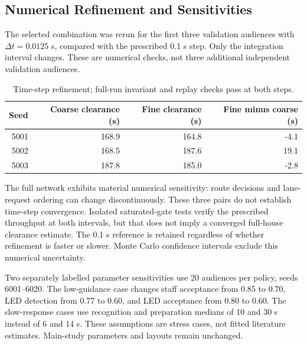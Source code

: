 \subsection{Numerical Refinement and Sensitivities}

The selected combination was rerun for the first three validation audiences with $\Delta t=0.0125$ s, compared with the prescribed 0.1 s step. Only the integration interval changes. These are numerical checks, not three additional independent validation audiences.

\begin{table}[htbp]\centering\small

\begin{tabular}{rrrr}\toprule

Seed & Coarse clearance (s) & Fine clearance (s) & Fine minus coarse (s)\\\midrule

5001 & 168.9 & 164.8 & -4.1\\

5002 & 168.5 & 187.6 & 19.1\\

5003 & 187.8 & 185.0 & -2.8\\

\bottomrule\end{tabular}\caption{Time-step refinement; full-run invariant and replay checks pass at both steps.}\end{table}

The full network exhibits material numerical sensitivity: route decisions and lane-request ordering can change discontinuously. These three pairs do not establish time-step convergence. Isolated saturated-gate tests verify the prescribed throughput at both intervals, but that does not imply a converged full-house clearance estimate. The 0.1 s reference is retained regardless of whether refinement is faster or slower. Monte Carlo confidence intervals exclude this numerical uncertainty.

Two separately labelled parameter sensitivities use 20 audiences per policy, seeds 6001--6020. The low-guidance case changes staff acceptance from 0.85 to 0.70, LED detection from 0.77 to 0.60, and LED acceptance from 0.80 to 0.60. The slow-response cases use recognition and preparation medians of 10 and 30 s instead of 6 and 14 s. These assumptions are stress cases, not fitted literature estimates. Main-study parameters and layouts remain unchanged.

